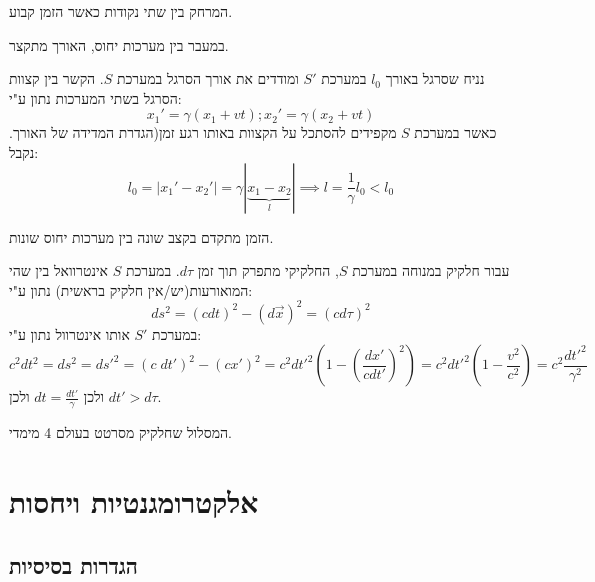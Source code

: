 \documentclass{tstextbook}
\begin{document}
\begin{definition}[אורך]
המרחק בין שתי נקודות כאשר הזמן קבוע.

\end{definition}
\begin{definition}
במעבר בין מערכות יחוס, האורך מתקצר.

\end{definition}
\begin{example}
נניח שסרגל באורך \(l_{0}\) במערכת \(S'\) ומודדים את אורך הסרגל במערכת \(S\). 
הקשר בין קצוות הסרגל בשתי המערכות נתון ע"י:
$$x_{1}'=\gamma(x_{1}+vt);x_{2}'=\gamma(x_{2}+vt)$$
כאשר במערכת \(S\) מקפידים להסתכל על הקצוות באותו רגע זמן(הגדרת המדידה של האורך. נקבל:
$$l_{0}=|x_{1}'-x_{2}'|=\gamma|\underbrace{ x_{1}-x_{2} }_{ l }|\implies l=\frac{1}{\gamma}l_{0}<l_{0}$$

\end{example}
\begin{definition}
הזמן מתקדם בקצב שונה בין מערכות יחוס שונות.

\end{definition}
\begin{example}
עבור חלקיק במנוחה במערכת \(S\), החלקיקי מתפרק תוך זמן \(d\tau\). 
במערכת \(S\) אינטרוואל בין שהי המואורעות(יש/אין חלקיק בראשית) נתון ע"י:
$$ds^2=(cdt)^2 - { \left( d\vec{x} \right)^2 }=\left( cd\tau \right)^2$$
במערכת \(S'\) אותו אינטרוול נתון ע"י:
$$c^2dt^2=ds^2=ds'^2=\left( c\;dt' \right)^2-(cx')^2=c^2dt'^2\left( 1-\left( \frac{dx'}{cdt'} \right)^2 \right)=c^2dt'^2\left( 1-\frac{v^2}{c^2} \right)=c^2 \frac{dt'^2}{\gamma ^2}$$
ולכן \(dt=\frac{dt'}{\gamma}\) ולכן \(dt'>d\tau\).

\end{example}
\begin{definition}[קו עולם]
המסלול שחלקיק מסרטט בעולם 4 מימדי.

\end{definition}
\chapter{אלקטרומגנטיות ויחסות}

\section{הגדרות בסיסיות}
\end{document}
